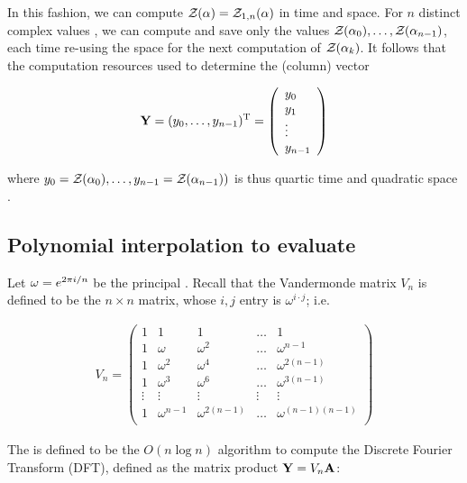 In this fashion, we can compute ${\mathcal Z}_{}(\alpha)={\mathcal Z}_{1,n}(\alpha)$ in
 time and  space. For $n$ distinct complex values
\alphaN, we can compute and save only the
values ${\mathcal Z}_{}(\alpha_0),\dots,{\mathcal Z}_{}(\alpha_{n-1})$, each time re-using the
 space for the next computation of ${\mathcal Z}_{}(\alpha_k)$. It follows that
the computation resources used to determine the (column) vector

\begin{align}
\label{eq:fftbor:yColumn}
\bfY = (y_0,\dots,y_{n-1})^{\text T} =
\left(
\begin{array}{l}
y_0 \\
y_1 \\
\vdots \\
y_{n-1} \\
\end{array}
\right)
\end{align}

where
$y_0={\mathcal Z}_{}(\alpha_0),\dots,y_{n-1}={\mathcal Z}_{}(\alpha_{n-1}))$ is thus quartic time  and quadratic space .

\subsection{Polynomial interpolation to evaluate
\texorpdfstring{}{}}
\label{subsec:fftbor:fft}

Let $\omega = e^{2 \pi i/n}$ be the principal \nRoU.
Recall that the Vandermonde matrix $V_n$ is defined to be the
$n \times n$ matrix, whose $i,j$ entry is $\omega^{i \cdot j}$; i.e.

\begin{align}
\label{eq:fftbor:vandermonde}
V_n =
\left(
\begin{array}{rrrrr}
1 & 1 & 1 & \dots & 1 \\
1 & \omega & \omega^2 & \dots & \omega^{n-1} \\
1 & \omega^2 & \omega^4 & \dots & \omega^{2(n-1)} \\
1 & \omega^3 & \omega^6 & \dots & \omega^{3(n-1)} \\
\vdots & \vdots & \vdots & \vdots & \vdots \\
1 & \omega^{n-1} & \omega^{2(n-1)} & \dots & \omega^{(n-1)(n-1)} \\
\end{array}
\right)
\end{align}

The \fft is defined to be the $O(n \log n)$
algorithm to compute the Discrete Fourier Transform (DFT), defined
as the matrix product ${\bf Y} = V_n {\bf A}$:


